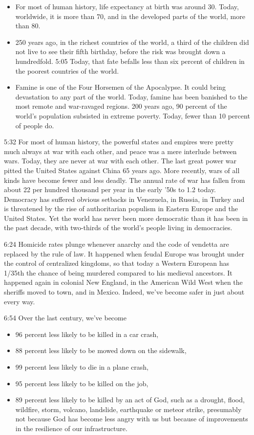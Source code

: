 \documentclass[10pt,titlepage]{article}
\begin{document}
\begin{itemize}
\item For most of human history, life expectancy at birth was around 30.
Today, worldwide, it is more than 70,
and in the developed parts of the world,
more than 80.
\item 250 years ago, in the richest countries of the world,
a third of the children did not live to see their fifth birthday,
before the risk was brought down a hundredfold.
5:05
Today, that fate befalls less than six percent of children
in the poorest countries of the world.
\item Famine is one of the Four Horsemen of the Apocalypse.
It could bring devastation to any part of the world.
Today, famine has been banished
to the most remote and war-ravaged regions.
200 years ago, 90 percent of the world's population
subsisted in extreme poverty.
Today, fewer than 10 percent of people do.
\end{itemize}

5:32
For most of human history,
the powerful states and empires
were pretty much always at war with each other,
and peace was a mere interlude between wars.
Today, they are never at war with each other.
The last great power war
pitted the United States against China 65 years ago.
More recently, wars of all kinds have become fewer and less deadly.
The annual rate of war has fallen from about 22 per hundred thousand per year
in the early '50s to 1.2 today.
Democracy has suffered obvious setbacks
in Venezuela, in Russia, in Turkey
and is threatened by the rise of authoritarian populism
in Eastern Europe and the United States.
Yet the world has never been more democratic
than it has been in the past decade,
with two-thirds of the world's people living in democracies.

6:24
Homicide rates plunge whenever anarchy and the code of vendetta
are replaced by the rule of law.
It happened when feudal Europe was brought under the control of centralized kingdoms,
so that today a Western European
has 1/35th the chance of being murdered
compared to his medieval ancestors.
It happened again in colonial New England,
in the American Wild West when the sheriffs moved to town,
and in Mexico.
Indeed, we've become safer in just about every way.

6:54
Over the last century, we've become
\begin{itemize}
\item 96 percent less likely
to be killed in a car crash,
\item 88 percent less likely to be mowed down on the sidewalk,
\item 99 percent less likely to die in a plane crash,
\item 95 percent less likely to be killed on the job,
\item 89 percent less likely to be killed by an act of God,
such as a drought, flood, wildfire, storm, volcano,
landslide, earthquake or meteor strike,
presumably not because God has become less angry with us
but because of improvements in the resilience of our infrastructure.
\end{itemize}
\end{document}
